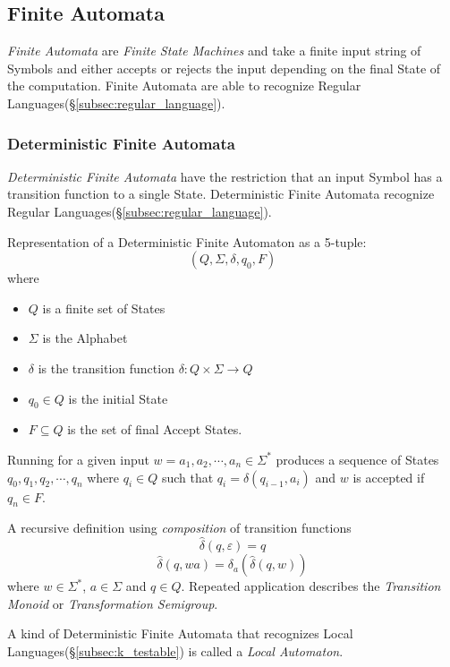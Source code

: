 \documentclass{article}
\begin{document}
\subsection{Finite Automata}

\emph{Finite Automata} are \emph{Finite State Machines} and take a
finite input string of Symbols and either accepts or rejects the
input depending on the final State of the computation. Finite
Automata are able to recognize Regular Languages(\S\ref{subsec:regular_language}).

\subsubsection{Deterministic Finite Automata}\label{subsec:dfa}
\emph{Deterministic Finite Automata} have the restriction that an
input Symbol has a transition function to a single State.
Deterministic Finite Automata recognize Regular
Languages(\S\ref{subsec:regular_language}).

Representation of a Deterministic Finite Automaton as a 5-tuple:
\[
    (Q,\Sigma,\delta,q_0,F)
\]
where
\begin{itemize}
\item $Q$ is a finite set of States
\item $\Sigma$ is the Alphabet
\item $\delta$ is the transition function $\delta: Q \times
  \Sigma \rightarrow Q$
\item $q_0 \in Q$ is the initial State
\item $F \subseteq Q$ is the set of final Accept States.
\end{itemize}

Running for a given input $w = a_1,a_2, \cdots , a_n \in \Sigma^*$
produces a sequence of States $q_0,q_1,q_2,\cdots , q_n$ where $q_i
\in Q$ such that $q_i = \delta (q_{i-1},a_i)$ and $w$ is accepted if
$q_n \in F$.

A recursive definition using \emph{composition} of transition
functions
\[
    \widehat{\delta}(q,\varepsilon) = q
\]\[
    \widehat{\delta}(q,wa) = \delta_a(\widehat{\delta}(q,w))
\]
where $w \in \Sigma^*$, $a \in \Sigma$ and $q \in Q$. Repeated
application describes the \emph{Transition Monoid} or
\emph{Transformation Semigroup}.

A kind of Deterministic Finite Automata that recognizes Local
Languages(\S\ref{subsec:k_testable}) is called a \emph{Local Automaton}.
\end{document}
